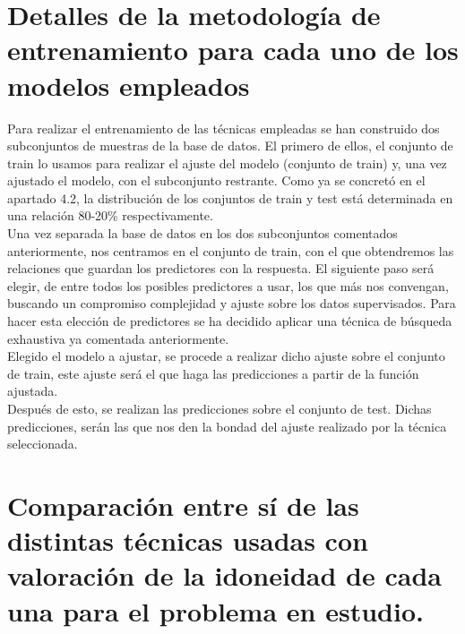 \section{Detalles de la metodología de entrenamiento para cada uno de los modelos empleados}
	
	Para realizar el entrenamiento de las técnicas empleadas se han construido dos subconjuntos de muestras de la base de datos. El primero de ellos, el conjunto de train lo usamos para realizar el ajuste del modelo (conjunto de train) y, una vez ajustado el modelo, con el subconjunto restrante. Como ya se concretó en el apartado 4.2, la distribución de los conjuntos de train y test está determinada en una relación 80-20\% respectivamente.\\
	
	Una vez separada la base de datos en los dos subconjuntos comentados anteriormente, nos centramos en el conjunto de train, con el que obtendremos las relaciones que guardan los predictores con la respuesta. El siguiente paso será elegir, de entre todos los posibles predictores a usar, los que más nos convengan, buscando un compromiso complejidad y ajuste sobre los datos supervisados. Para hacer esta elección de predictores se ha decidido aplicar una técnica de búsqueda exhaustiva ya comentada anteriormente.\\
	
	 Elegido el modelo a ajustar, se procede a realizar dicho ajuste sobre el conjunto de train, este ajuste será el que haga las predicciones a partir de la función ajustada.\\
	
	Después de esto, se realizan las predicciones sobre el conjunto de test. Dichas predicciones, serán las que nos den la bondad del ajuste realizado por la técnica seleccionada.



\section{Comparación entre sí de las distintas técnicas usadas con valoración de la idoneidad de cada una para el problema en estudio.}

